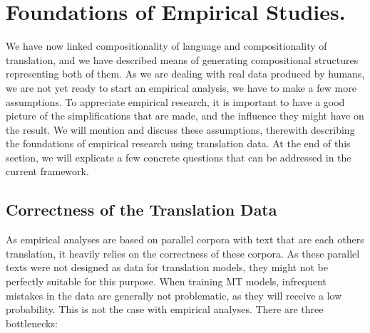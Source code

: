 \documentclass{report}
\theoremstyle{definition}
\theoremstyle{plain}
\begin{document}
\section{Foundations of Empirical Studies.}

We have now linked compositionality of language and compositionality of translation, and we have described means of generating compositional structures representing both of them. As we are dealing with real data produced by humans, we are not yet ready to start an empirical analysis, we have to make a few more assumptions. To appreciate empirical research, it is important to have a good picture of the simplifications that are made, and the influence they might have on the result. We will mention and discuss these assumptions, therewith describing the foundations of empirical research using translation data. At the end of this section, we will explicate a few concrete questions that can be addressed in the current framework.
%


\subsection{Correctness of the Translation Data}

As empirical analyses are based on parallel corpora with text that are each others translation, it heavily relies on the correctness of these corpora. As these parallel texts were not designed as data for translation models, they might not be perfectly suitable for this purpose. When training MT models, infrequent mistakes in the data are generally not problematic, as they will receive a low probability. This is not the case with empirical analyses. There are three bottlenecks:
\end{document}
